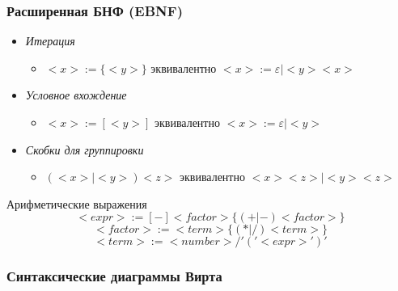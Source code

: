 \documentclass[a4paper, 14pt]{extarticle}
\begin{document}
\subsubsection{Расширенная БНФ (EBNF)}
\begin{itemize}
    \item \textit{Итерация}
    \begin{itemize}
        \item $<x> := \{ <y> \}$ эквивалентно $ <x> := \varepsilon | <y><x> $
    \end{itemize}
    \item \textit{Условное вхождение}
    \begin{itemize}
        \item $<x> := [<y>]$ эквивалентно $<x>:= \varepsilon | <y> $
    \end{itemize}
    \item \textit{Скобки для группировки} 
    \begin{itemize}
        \item $(<x>|<y>)<z>$ эквивалентно $<x><z> | <y><z>$
    \end{itemize}
\end{itemize}

\begin{example}{ Арифметические выражения }
\[ <expr> := [-] <factor> \{ (+ | -) <factor> \}  \]
\[ <factor> := <term> \{ (* | /) <term> \} \]
\[ <term> := <number> / '('<expr>')' \]
\end{example}

\subsubsection{Синтаксические диаграммы Вирта}
\end{document}
